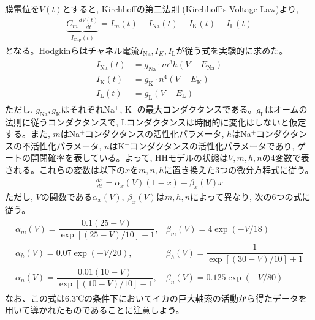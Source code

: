 \documentclass[letterpaper,10pt,english]{sphinxmanual}
\begin{document}
膜電位を\(V(t)\)とすると, Kirchhoffの第二法則 (Kirchhoff’s Voltage Law)より,
\begin{equation*}
\begin{split}
\underbrace{C_m\frac {dV(t)}{dt}}_{I_\text{Cap} (t)}=I_{m}(t)-I_\text{Na}(t)-I_\text{K}(t)-I_\text{L}(t)
\end{split}
\end{equation*}
となる。Hodgkinらはチャネル電流\(I_\text{Na}, I_K, I_\text{L}\)が従う式を実験的に求めた。
\begin{equation*}
\begin{split}
\begin{aligned}
I_\text{Na}(t) &= g_{\text{Na}}\cdot m^{3}h(V-E_{\text{Na}})\\
I_\text{K}(t) &= g_{\text{K}}\cdot n^{4}(V-E_{\text{K}})\\
I_\text{L}(t) &= g_{\text{L}}(V-E_{\text{L}})
\end{aligned}
\end{split}
\end{equation*}
ただし, \(g_{\text{Na}}, g_{\text{K}}\)はそれぞれNa\(^+\), K\(^+\)の最大コンダクタンスである。\(g_{\text{L}}\)はオームの法則に従うコンダクタンスで, Lコンダクタンスは時間的に変化はしないと仮定する。また, \(m\)はNa\(^+\)コンダクタンスの活性化パラメータ, \(h\)はNa\(^+\)コンダクタンスの不活性化パラメータ, \(n\)はK\(^+\)コンダクタンスの活性化パラメータであり, ゲートの開閉確率を表している。よって, HHモデルの状態は\(V, m, h, n\)の4変数で表される。これらの変数は以下の\(x\)を\(m, n, h\)に置き換えた3つの微分方程式に従う。
\begin{equation*}
\begin{split}
\frac{dx}{dt}=\alpha_{x}(V)(1-x)-\beta_{x}(V)x
\end{split}
\end{equation*}
ただし, \(V\)の関数である\(\alpha_{x}(V),\ \beta_{x}(V)\)は\(m, h, n\)によって異なり, 次の6つの式に従う。
\begin{equation*}
\begin{split}
\begin{array}{ll}
\alpha_{m}(V)=\dfrac {0.1(25-V)}{\exp \left[(25-V)/10\right]-1}, &\beta_{m}(V)=4\exp {(-V/18)}\\
\alpha_{h}(V)=0.07\exp {(-V/20)}, & \beta_{h}(V)={\dfrac{1}{\exp {\left[(30-V)/10 \right]}+1}}\\
\alpha_{n}(V)={\dfrac {0.01(10-V)}{\exp {\left[(10-V)/10\right]}-1}},& \beta_{n}(V)=0.125\exp {(-V/80)} 
\end{array}
\end{split}
\end{equation*}
なお、この式は6.3℃の条件下においてイカの巨大軸索の活動から得たデータを用いて導かれたものであることに注意しよう。
\end{document}
